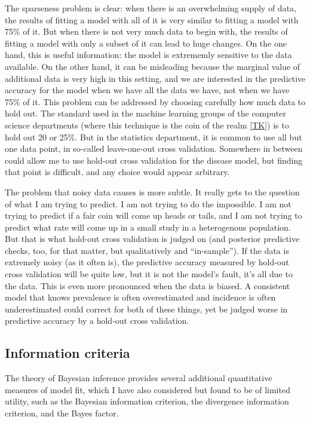The sparseness problem is clear: when there is an overwhelming supply of
data, the results of fitting a model with all of it is very similar to
fitting a model with 75\% of it.  But when there is not very much data
to begin with, the results of fitting a model with only a subset of it
can lead to huge changes.  On the one hand, this is useful
information: the model is extrememly sensitive to the data available.
On the other hand, it can be misleading because the marginal value of
additional data is very high in this setting, and we are interested in
the predictive accuracy for the model when we have all the data we
have, not when we have 75\% of it.  This problem can be addressed by
choosing carefully how much data to hold out.  The standard used in
the machine learning groups of the computer science departments (where
this technique is the coin of the realm \ref{TK}) is to hold out 20 or
25\%.  But in the statistics department, it is common to use all but
one data point, in so-called leave-one-out cross validation.
Somewhere in between could allow me to use hold-out cross validation
for the disease model, but finding that point is difficult, and any
choice would appear arbitrary.

The problem that noisy data causes is more subtle.  It really gets to
the question of what I am trying to predict.  I am not trying to
do the impossible.  I am not trying to predict if a fair coin will
come up heads or tails, and I am not trying to predict what rate will
come up in a small study in a heterogenous population.  But that is
what hold-out cross validation is judged on (and posterior predictive
checks, too, for that matter, but qualitatively and ``in-sample'').
If the data is extremely noisy (as it often is), the predictive
accuracy measured by hold-out cross validation will be quite low, but
it is not the model's fault, it's all due to the data.  This is even
more pronounced when the data is biased.  A consistent model that
knows prevalence is often overestimated and incidence is often
underestimated could correct for both of these things, yet be judged
worse in predictive accuracy by a hold-out cross validation.

\subsection{Information criteria}
The theory of Bayesian inference provides several additional
quantitative measures of model fit, which I have also considered but
found to be of limited utility, such as the Bayesian information
criterion, the divergence information criterion, and the Bayes factor.

